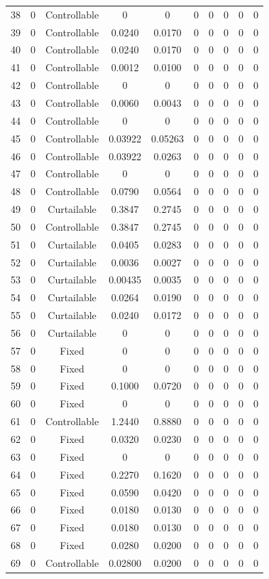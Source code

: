\begin{longtable}{cccccccccc}
	38 & 0 & Controllable & 0 & 0 & 0 & 0 & 0 & 0 & 0 \\
	39 & 0 & Controllable & 0.0240 & 0.0170 & 0 & 0 & 0 & 0 & 0 \\
	40 & 0 & Controllable & 0.0240 & 0.0170 & 0 & 0 & 0 & 0 & 0 \\
	41 & 0 & Controllable & 0.0012 & 0.0100 & 0 & 0 & 0 & 0 & 0 \\
	42 & 0 & Controllable & 0 & 0 & 0 & 0 & 0 & 0 & 0 \\
	43 & 0 & Controllable & 0.0060 & 0.0043 & 0 & 0 & 0 & 0 & 0 \\
	44 & 0 & Controllable & 0 & 0 & 0 & 0 & 0 & 0 & 0 \\
	45 & 0 & Controllable & 0.03922 & 0.05263 & 0 & 0 & 0 & 0 & 0 \\
	46 & 0 & Controllable & 0.03922 & 0.0263 & 0 & 0 & 0 & 0 & 0 \\
	47 & 0 & Controllable & 0 & 0 & 0 & 0 & 0 & 0 & 0 \\
	48 & 0 & Controllable & 0.0790 & 0.0564 & 0 & 0 & 0 & 0 & 0 \\
	49 & 0 & Curtailable & 0.3847 & 0.2745 & 0 & 0 & 0 & 0 & 0 \\
	50 & 0 & Controllable & 0.3847 & 0.2745 & 0 & 0 & 0 & 0 & 0 \\
	51 & 0 & Curtailable & 0.0405 & 0.0283 & 0 & 0 & 0 & 0 & 0 \\
	52 & 0 & Curtailable & 0.0036 & 0.0027 & 0 & 0 & 0 & 0 & 0 \\
	53 & 0 & Curtailable & 0.00435 & 0.0035 & 0 & 0 & 0 & 0 & 0 \\
	54 & 0 & Curtailable & 0.0264 & 0.0190 & 0 & 0 & 0 & 0 & 0 \\
	55 & 0 & Curtailable & 0.0240 & 0.0172 & 0 & 0 & 0 & 0 & 0 \\
	56 & 0 & Curtailable & 0 & 0 & 0 & 0 & 0 & 0 & 0 \\
	57 & 0 & Fixed & 0 & 0 & 0 & 0 & 0 & 0 & 0 \\
	58 & 0 & Fixed & 0 & 0 & 0 & 0 & 0 & 0 & 0 \\
	59 & 0 & Fixed & 0.1000 & 0.0720 & 0 & 0 & 0 & 0 & 0 \\
	60 & 0 & Fixed & 0 & 0 & 0 & 0 & 0 & 0 & 0 \\
	61 & 0 & Controllable & 1.2440 & 0.8880 & 0 & 0 & 0 & 0 & 0 \\
	62 & 0 & Fixed & 0.0320 & 0.0230 & 0 & 0 & 0 & 0 & 0 \\
	63 & 0 & Fixed & 0 & 0 & 0 & 0 & 0 & 0 & 0 \\
	64 & 0 & Fixed & 0.2270 & 0.1620 & 0 & 0 & 0 & 0 & 0 \\
	65 & 0 & Fixed & 0.0590 & 0.0420 & 0 & 0 & 0 & 0 & 0 \\
	66 & 0 & Fixed & 0.0180 & 0.0130 & 0 & 0 & 0 & 0 & 0 \\
	67 & 0 & Fixed & 0.0180 & 0.0130 & 0 & 0 & 0 & 0 & 0 \\
	68 & 0 & Fixed & 0.0280 & 0.0200 & 0 & 0 & 0 & 0 & 0 \\
	69 & 0 & Controllable & 0.02800 & 0.0200 & 0 & 0 & 0 & 0 & 0 \\
	\bottomrule %
\end{longtable}
